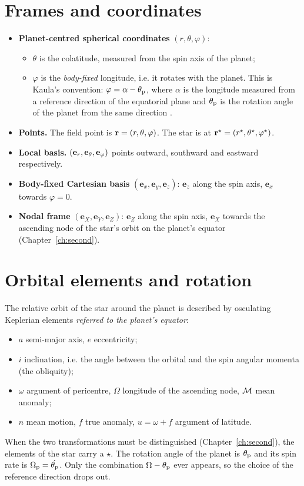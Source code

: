 \section{Frames and coordinates}
\begin{itemize}
  \item \textbf{Planet-centred spherical coordinates} $(r,\theta,\varphi)$:
  \begin{itemize}
    \item $\theta$ is the colatitude, measured from the spin axis of the planet;
    \item $\varphi$ is the \emph{body-fixed} longitude, i.e. it rotates with the planet. This is Kaula's convention: $\varphi=\alpha-\theta_{\mathrm p}$, where $\alpha$ is the longitude measured from a reference direction of the equatorial plane and $\theta_{\mathrm p}$ is the rotation angle of the planet from the same direction \citep[eq.~3.53--3.54]{Kaula2000}.
  \end{itemize}
  \item \textbf{Points.} The field point is $\mathbf r=(r,\theta,\varphi)$. The star is at $\mathbf r^\star=(r^\star,\theta^\star,\varphi^\star)$.
  \item \textbf{Local basis.} $(\mathbf e_r,\mathbf e_\theta,\mathbf e_\varphi)$ points outward, southward and eastward respectively.
  \item \textbf{Body-fixed Cartesian basis} $(\mathbf e_x,\mathbf e_y,\mathbf e_z)$: $\mathbf e_z$ along the spin axis, $\mathbf e_x$ towards $\varphi=0$.
  \item \textbf{Nodal frame} $(\mathbf e_X,\mathbf e_Y,\mathbf e_Z)$: $\mathbf e_Z$ along the spin axis, $\mathbf e_X$ towards the ascending node of the star's orbit on the planet's equator (Chapter~\ref{ch:second}).
\end{itemize}

\section{Orbital elements and rotation}
The relative orbit of the star around the planet is described by osculating Keplerian elements \emph{referred to the planet's equator}:
\begin{itemize}
  \item $a$ semi-major axis, $e$ eccentricity;
  \item $i$ inclination, i.e. the angle between the orbital and the spin angular momenta (the obliquity);
  \item $\omega$ argument of pericentre, $\Omega$ longitude of the ascending node, $\mathcal{M}$ mean anomaly;
  \item $n$ mean motion, $f$ true anomaly, $u=\omega+f$ argument of latitude.
\end{itemize}
When the two transformations must be distinguished (Chapter~\ref{ch:second}), the elements of the star carry a $\star$. The rotation angle of the planet is $\theta_{\mathrm p}$ and its spin rate is $\Omega_{\mathrm p}=\dot{\theta_{\mathrm p}}$. Only the combination $\Omega-\theta_{\mathrm p}$ ever appears, so the choice of the reference direction drops out.


